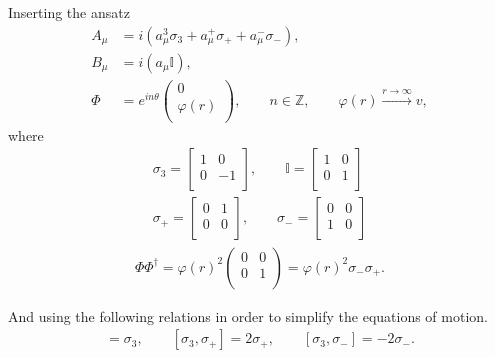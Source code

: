 Inserting the ansatz
\begin{align}
    A_{\mu} &= i \left(a_{\mu}^3 \sigma_3 + a_{\mu}^+ \sigma_{+} +a_{\mu}^{-} \sigma_{-} \right), \label{eq:U2_ansatz_non_abelian_gauge} \\
    B_{\mu} &= i \left( a_{\mu} \mathbb{I} \right), \label{eq:U2_ansatz_abelian_gauge}\\
    \Phi &=  e^{i n \theta} \begin{pmatrix}
        0\\
        \varphi(r)\\
    \end{pmatrix}, \qquad n\in \mathbb{Z}, \qquad \varphi(r) \xrightarrow{r \rightarrow \infty} v, \label{eq:U2_ansatz_scalar}
\end{align}
    where
    \begin{align}
        \sigma_3 = \begin{bmatrix}
            1 & 0 \\
            0 & -1 \\
        \end{bmatrix}, \qquad \mathbb{I}= \begin{bmatrix}
            1 & 0\\
            0 & 1\\
        \end{bmatrix} \\
        \sigma_+ =\begin{bmatrix}
            0 & 1\\
            0 & 0\\
        \end{bmatrix}, \qquad \sigma_- = \begin{bmatrix}
            0 &0\\
            1 &0\\
        \end{bmatrix}
    \end{align}
    \begin{align}
        \Phi \Phi^{\dag} = \varphi(r)^2 \begin{pmatrix} 
            0 & 0\\
            0 & 1\\
        \end{pmatrix} = \varphi(r)^2 \sigma_- \sigma_+.
    \end{align}

    And using the following relations in order to simplify the equations of motion.
    \begin{align}
        [\sigma_+, \sigma_-] = \sigma_3, \qquad [\sigma_3, \sigma_+] = 2 \sigma_+, \qquad [\sigma_3, \sigma_-] = -2 \sigma_-.
    \end{align}

